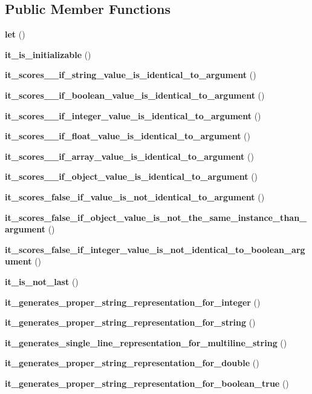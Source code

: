 \subsection*{Public Member Functions}
\begin{DoxyCompactItemize}
\item 
{\bf let} ()
\item 
{\bf it\+\_\+is\+\_\+initializable} ()
\item 
{\bf it\+\_\+scores\+\_\+\_\+if\+\_\+string\+\_\+value\+\_\+is\+\_\+identical\+\_\+to\+\_\+argument} ()
\item 
{\bf it\+\_\+scores\+\_\+\_\+if\+\_\+boolean\+\_\+value\+\_\+is\+\_\+identical\+\_\+to\+\_\+argument} ()
\item 
{\bf it\+\_\+scores\+\_\+\_\+if\+\_\+integer\+\_\+value\+\_\+is\+\_\+identical\+\_\+to\+\_\+argument} ()
\item 
{\bf it\+\_\+scores\+\_\+\_\+if\+\_\+float\+\_\+value\+\_\+is\+\_\+identical\+\_\+to\+\_\+argument} ()
\item 
{\bf it\+\_\+scores\+\_\+\_\+if\+\_\+array\+\_\+value\+\_\+is\+\_\+identical\+\_\+to\+\_\+argument} ()
\item 
{\bf it\+\_\+scores\+\_\+\_\+if\+\_\+object\+\_\+value\+\_\+is\+\_\+identical\+\_\+to\+\_\+argument} ()
\item 
{\bf it\+\_\+scores\+\_\+false\+\_\+if\+\_\+value\+\_\+is\+\_\+not\+\_\+identical\+\_\+to\+\_\+argument} ()
\item 
{\bf it\+\_\+scores\+\_\+false\+\_\+if\+\_\+object\+\_\+value\+\_\+is\+\_\+not\+\_\+the\+\_\+same\+\_\+instance\+\_\+than\+\_\+argument} ()
\item 
{\bf it\+\_\+scores\+\_\+false\+\_\+if\+\_\+integer\+\_\+value\+\_\+is\+\_\+not\+\_\+identical\+\_\+to\+\_\+boolean\+\_\+argument} ()
\item 
{\bf it\+\_\+is\+\_\+not\+\_\+last} ()
\item 
{\bf it\+\_\+generates\+\_\+proper\+\_\+string\+\_\+representation\+\_\+for\+\_\+integer} ()
\item 
{\bf it\+\_\+generates\+\_\+proper\+\_\+string\+\_\+representation\+\_\+for\+\_\+string} ()
\item 
{\bf it\+\_\+generates\+\_\+single\+\_\+line\+\_\+representation\+\_\+for\+\_\+multiline\+\_\+string} ()
\item 
{\bf it\+\_\+generates\+\_\+proper\+\_\+string\+\_\+representation\+\_\+for\+\_\+double} ()
\item 
{\bf it\+\_\+generates\+\_\+proper\+\_\+string\+\_\+representation\+\_\+for\+\_\+boolean\+\_\+true} ()

\end{DoxyCompactItemize}
